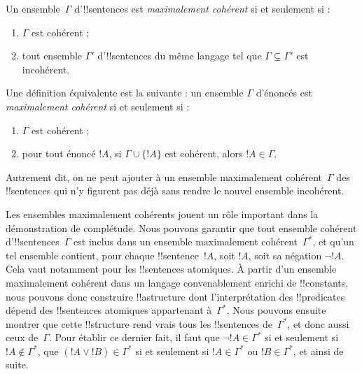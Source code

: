 \documentclass[../../../include/open-logic-section]{subfiles}
\begin{document}

\begin{defn}
Un ensemble~$\Gamma$ d'!!{sentence}s est
\emph{maximalement cohérent} si et seulement si :
\begin{enumerate}
\item $\Gamma$ est cohérent ;
\item tout ensemble $\Gamma'$ d'!!{sentence}s du même langage
tel que $\Gamma\subsetneq\Gamma'$ est incohérent.
\end{enumerate}
\end{defn}

\begin{explain}
Une définition équivalente est la suivante : un ensemble
$\Gamma$ d'énoncés est \emph{maximalement cohérent} si et
seulement si :
\begin{enumerate}
\item $\Gamma$ est cohérent ;
\item pour tout énoncé $!A$, si $\Gamma\cup\{!A\}$ est
cohérent, alors $!A\in\Gamma$.
\end{enumerate}
Autrement dit, on ne peut ajouter à un ensemble maximalement
cohérent~$\Gamma$ des !!{sentence}s qui n'y figurent pas déjà
sans rendre le nouvel ensemble incohérent.
\end{explain}

\begin{explain}
Les ensembles maximalement cohérents jouent un rôle important
dans la démonstration de complétude. Nous pouvons garantir que
tout ensemble cohérent d'!!{sentence}s~$\Gamma$ est inclus
dans un ensemble maximalement cohérent~$\Gamma^*$, et qu'un
tel ensemble contient, pour chaque !!{sentence}~$!A$, soit
$!A$, soit sa négation $\lnot !A$. Cela vaut notamment pour
les !!{sentence}s atomiques. À partir d'un ensemble
maximalement cohérent dans un langage convenablement enrichi
de !!{constant}s, nous pouvons donc construire !!a{structure}
dont l'interprétation des !!{predicate}s dépend des
!!{sentence}s atomiques appartenant à~$\Gamma^*$.
Nous pouvons ensuite montrer que cette !!{structure} rend
vrais tous les !!{sentence}s de~$\Gamma^*$, et donc aussi
ceux de~$\Gamma$. Pour établir ce dernier fait, il faut que
$\lnot !A\in\Gamma^*$ si et seulement si $!A\notin\Gamma^*$,
que $(!A\lor !B)\in\Gamma^*$ si et seulement si
$!A\in\Gamma^*$ ou $!B\in\Gamma^*$, et ainsi de suite.
\end{explain}
\end{document}
